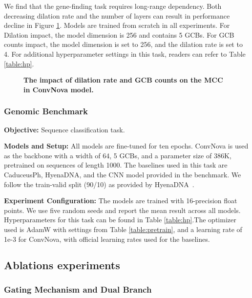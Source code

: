 We find that the gene-finding task requires long-range dependency. Both decreasing dilation rate and the number of layers can result in performance decline in Figure \ref{fig:mccdilation}. Models are trained from scratch in all experiments. For Dilation impact, the model dimension is 256 and contains 5 GCBs. For GCB counts impact, the model dimension is set to 256, and the dilation rate is set to 4. For additional hyperparameter settings in this task, readers can refer to Table \ref{table:hp}.

\begin{figure}[hbtp!]
\begin{minipage}[]{\textwidth}
 \centering
 \caption{\textbf{The impact of dilation rate and GCB counts on the MCC in ConvNova model.}}
 \label{fig:mccdilation}
\end{minipage}
\end{figure}

\subsubsection{Genomic Benchmark}\label{app:genomicbenchmark}
\textbf{Objective:} Sequence classification task.

\textbf{Models and Setup:} All models are fine-tuned for ten epochs. ConvNova is used as the backbone with a width of 64, 5 GCBs, and a parameter size of 386K, pretrained on sequences of length 1000. The baselines used in this task are CaduceusPh, HyenaDNA, and the CNN model provided in the benchmark. We follow the train-valid split (90/10) as provided by HyenaDNA~\citep{nguyen2024hyenadna}.

\textbf{Experiment Configuration:} The models are trained with 16-precision float points. We use five random seeds and report the mean result across all models. Hyperparameters for this task can be found in Table \ref{table:hp}.The optimizer used is AdamW with settings from Table \ref{table:pretrain}, and a learning rate of 1e-3 for ConvNova, with official learning rates used for the baselines.

\subsection{Ablations experiments}
\subsubsection{ Gating Mechanism and Dual Branch}\label{app:ablation}

